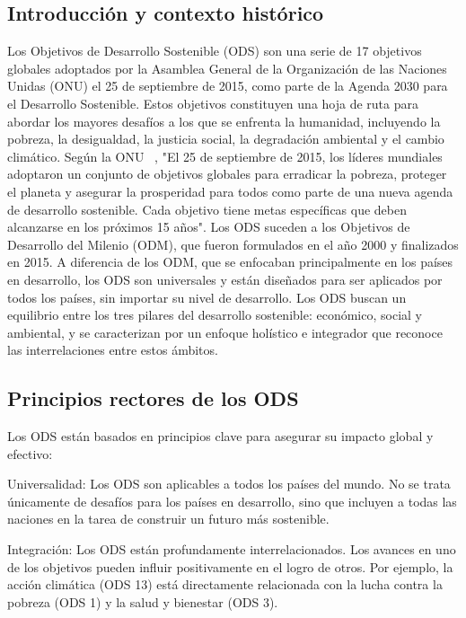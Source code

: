 	\subsection{Introducción y contexto histórico}
	Los Objetivos de Desarrollo Sostenible (ODS) son una serie de 17 objetivos globales adoptados por la Asamblea General de la Organización de las Naciones Unidas (ONU) el 25 de septiembre de 2015, como parte de la Agenda 2030 para el Desarrollo Sostenible. Estos objetivos constituyen una hoja de ruta para abordar los mayores desafíos a los que se enfrenta la humanidad, incluyendo la pobreza, la desigualdad, la justicia social, la degradación ambiental y el cambio climático. Según la ONU ~\cite{un_sustainable_development}, "El 25 de septiembre de 2015, los líderes mundiales adoptaron un conjunto de objetivos globales para erradicar la pobreza, proteger el planeta y asegurar la prosperidad para todos como parte de una nueva agenda de desarrollo sostenible. Cada objetivo tiene metas específicas que deben alcanzarse en los próximos 15 años".		
	Los ODS suceden a los Objetivos de Desarrollo del Milenio (ODM), que fueron formulados en el año 2000 y finalizados en 2015. A diferencia de los ODM, que se enfocaban principalmente en los países en desarrollo, los ODS son universales y están diseñados para ser aplicados por todos los países, sin importar su nivel de desarrollo. Los ODS buscan un equilibrio entre los tres pilares del desarrollo sostenible: económico, social y ambiental, y se caracterizan por un enfoque holístico e integrador que reconoce las interrelaciones entre estos ámbitos.
	
	\subsection{Principios rectores de los ODS}
	
	Los ODS están basados en principios clave para asegurar su impacto global y efectivo:
	
	Universalidad: Los ODS son aplicables a todos los países del mundo. No se trata únicamente de desafíos para los países en desarrollo, sino que incluyen a todas las naciones en la tarea de construir un futuro más sostenible.
	
	Integración: Los ODS están profundamente interrelacionados. Los avances en uno de los objetivos pueden influir positivamente en el logro de otros. Por ejemplo, la acción climática (ODS 13) está directamente relacionada con la lucha contra la pobreza (ODS 1) y la salud y bienestar (ODS 3).
	
